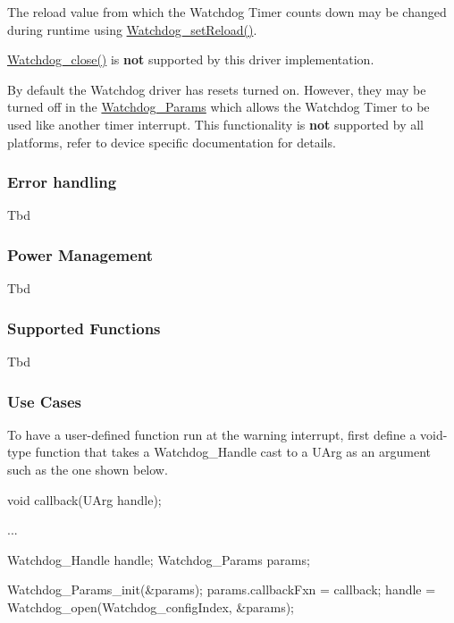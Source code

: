 The reload value from which the Watchdog Timer counts down may be changed during runtime using \hyperlink{_watchdog_8h_a77ec81e1304fe05b77a9976e10e2d9a3}{Watchdog\+\_\+set\+Reload()}.

\hyperlink{_watchdog_8h_a1c0dfea7011b06f303d01afb631ffbdd}{Watchdog\+\_\+close()} is {\bfseries not} supported by this driver implementation.

By default the Watchdog driver has resets turned on. However, they may be turned off in the \hyperlink{struct_watchdog___params}{Watchdog\+\_\+\+Params} which allows the Watchdog Timer to be used like another timer interrupt. This functionality is {\bfseries not} supported by all platforms, refer to device specific documentation for details.

\subsubsection*{Error handling}

Tbd

\subsubsection*{Power Management}

Tbd

\subsubsection*{Supported Functions}

Tbd

\subsubsection*{Use Cases}

To have a user-\/defined function run at the warning interrupt, first define a void-\/type function that takes a Watchdog\+\_\+\+Handle cast to a U\+Arg as an argument such as the one shown below.


\begin{DoxyCode}
\textcolor{keywordtype}{void} callback(UArg handle);

...

Watchdog\_Handle handle;
Watchdog_Params params;

Watchdog_Params_init(&params);
params.callbackFxn = callback;
handle = Watchdog_open(Watchdog\_configIndex, &params);
\end{DoxyCode}


